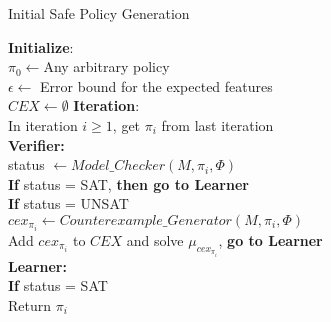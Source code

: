 \begin{algorithm}[htpb]
\caption{Initial Safe Policy Generation}
\begin{algorithmic}[1]
\State \textbf{Initialize}: 
\\\qquad$\pi_0\gets$Any arbitrary policy    
\\\qquad$\epsilon\gets$ Error bound for the expected features
\\\qquad$CEX\gets\emptyset$
\State \textbf{Iteration}: 
\\\qquad In iteration $i\geq1$, get $\pi_i$ from last iteration
\\\qquad\textbf{Verifier:}
\\\qquad\qquad status $\gets Model\_Checker(M,\pi_i, \Phi)$
\\\qquad\qquad \textbf{If} status = SAT, \textbf{then go to Learner}
\\\qquad\qquad \textbf{If} status = UNSAT
\\\qquad\qquad\qquad $cex_{\pi_i}\gets Counterexample\_Generator(M,\pi_i,\Phi)$
\\\qquad\qquad\qquad Add $cex_{\pi_i}$ to $CEX$ and solve $\mu_{cex_{\pi_i}}$, \textbf{go to Learner} 
\\\qquad\textbf{Learner:}
\\\qquad\qquad \textbf{If} status = SAT
\\\qquad\qquad\qquad Return $\pi_i$

\end{algorithmic}
\end{algorithm}
